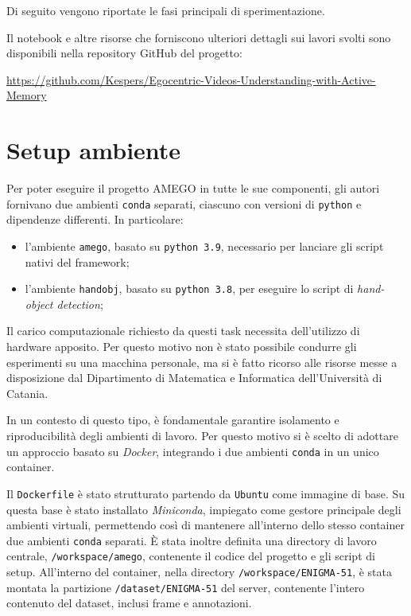 Di seguito vengono riportate le fasi principali di sperimentazione.

Il notebook e altre risorse che forniscono ulteriori dettagli sui lavori svolti sono disponibili nella repository GitHub del progetto: 
\begin{center}
    \footnotesize
    \href{https://github.com/Kespers/Egocentric-Videos-Understanding-with-Active-Memory}{https://github.com/Kespers/Egocentric-Videos-Understanding-with-Active-Memory}
\end{center}

\section{Setup ambiente}

Per poter eseguire il progetto AMEGO in tutte le sue componenti, gli autori fornivano due ambienti \texttt{conda} separati, ciascuno con versioni di \texttt{python} e dipendenze differenti. In particolare:
\begin{itemize}
    \item l'ambiente \texttt{amego}, basato su \texttt{python 3.9}, necessario per lanciare gli script nativi del framework;
    \item l'ambiente \texttt{handobj}, basato su \texttt{python 3.8}, per eseguire lo script di \emph{hand-object detection};
\end{itemize}

Il carico computazionale richiesto da questi task necessita dell'utilizzo di hardware apposito. Per questo motivo non è stato possibile condurre gli esperimenti su una macchina personale, ma si è fatto ricorso alle risorse messe a disposizione dal Dipartimento di Matematica e Informatica dell'Università di Catania.  

In un contesto di questo tipo, è fondamentale garantire isolamento e riproducibilità degli ambienti di lavoro. Per questo motivo si è scelto di adottare un approccio basato su \emph{Docker}, integrando i due ambienti \texttt{conda} in un unico container.

Il \texttt{Dockerfile} è stato strutturato partendo da \texttt{Ubuntu} come immagine di base. Su questa base è stato installato \emph{Miniconda}, impiegato come gestore principale degli ambienti virtuali, permettendo così di mantenere all'interno dello stesso container due ambienti \texttt{conda} separati.  
È stata inoltre definita una directory di lavoro centrale, \texttt{/workspace/amego}, contenente il codice del progetto e gli script di setup. All'interno del container, nella directory \texttt{/workspace/ENIGMA-51}, è stata montata la partizione \texttt{/dataset/ENIGMA-51} del server, contenente l'intero contenuto del dataset, inclusi frame e annotazioni.

